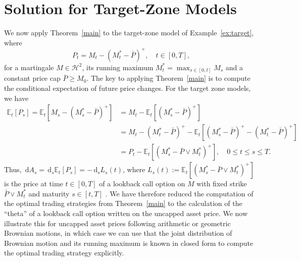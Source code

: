 \documentclass[11pt]{article}
\numberwithin{equation}{section}
\theoremstyle{definition}
\theoremstyle{remark}
\newtheorem{rem}[thm]{Remark}
\newcommand{\E}{\mathbb{E}} %
\newcommand{\de}{\,\mathrm{d}}
\begin{document}
\section{Solution for Target-Zone Models}\label{s:cap}

We now apply Theorem~\ref{main} to the target-zone model of Example~\ref{ex:target}, where
$$
P_t=M_t -(M^*_t-\bar{P})^+, \quad t \in [0,T],
$$
for a martingale $M\in\mathcal{H}^2$, its running maximum $M^*_t=\max_{s \in [0,t]}M_s$ and a constant price cap $\bar{P} \geq M_0$. The key to applying Theorem~\ref{main} is to compute the conditional expectation of future price changes. For the target zone models, we have
\begin{align*}
\E_t[P_s] = \E_t\left[M_s-(M^*_s-\bar{P})^+\right] &= M_t-\E_t\left[(M^*_s-\bar{P})^+\right]\\
& =M_t-(M^*_t-\bar{P})^+ - \E_t\left[(M^*_s-\bar{P})^+ - (M^*_t-\bar{P})^+\right]\\
&=P_t - \E_t\left[(M^*_s-\bar{P}\vee M^*_t)^+\right], \quad 0 \leq t \leq s \leq T.
\end{align*}
Thus, $\de A_s=\de_s \E_t[P_s] = -\de_s L_s(t)$, where $L_s(t):=\E_t[(M^*_s-\bar{P}\vee M^*_t)^+]$ is the price at time $t \in [0,T]$ of a lookback call option on $M$ with fixed strike $\bar{P}\vee M^*_t$ and maturity $s \in [t,T]$ . We have therefore reduced the computation of the optimal trading strategies from Theorem~\ref{main} to the calculation of the ``theta'' of a lookback call option written on the uncapped asset price. We now illustrate this for uncapped asset prices following arithmetic or geometric Brownian motions, in which case we can use that the joint distribution of Brownian motion and its running maximum is known in closed form to compute the optimal trading strategy explicitly.

\end{document}

